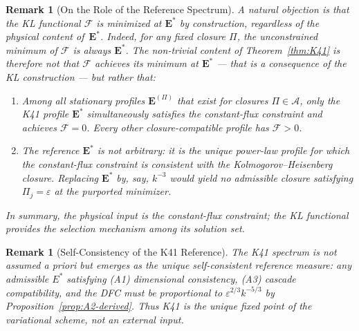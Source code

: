 \documentclass[12pt,a4paper]{article}
\theoremstyle{breakdef}
\theoremstyle{breakplain}
\theoremstyle{breakdef}
\newtheorem{remark}[definition]{Remark}
\begin{document}
\begin{remark}[On the Role of the Reference Spectrum]\label{rem:circularity}
A natural objection is that the KL functional $\mathcal{F}$ is
\emph{minimized at} $\mathbf{E}^*$ \emph{by construction}, regardless
of the physical content of~$\mathbf{E}^*$.  Indeed, for any fixed
closure $\Pi$, the unconstrained minimum of $\mathcal{F}$ is always
$\mathbf{E}^*$.  The non-trivial content of Theorem~\ref{thm:K41} is
therefore not that $\mathcal{F}$ achieves its minimum at $\mathbf{E}^*$
--- that is a consequence of the KL construction --- but rather that:
\begin{enumerate}
\item Among all stationary profiles $\mathbf{E}^{(\Pi)}$ that exist for
  closures $\Pi \in \mathscr{A}$, only the K41 profile $\mathbf{E}^*$
  \emph{simultaneously satisfies} the constant-flux constraint and
  achieves $\mathcal{F} = 0$.  Every other closure-compatible profile
  has $\mathcal{F} > 0$.
\item The reference $\mathbf{E}^*$ is not arbitrary: it is the
  \emph{unique} power-law profile for which the constant-flux constraint
  is consistent with the Kolmogorov--Heisenberg closure.  Replacing
  $\mathbf{E}^*$ by, say, $k^{-3}$ would yield no admissible closure
  satisfying $\Pi_j = \varepsilon$ at the purported minimizer.
\end{enumerate}
In summary, the physical input is the constant-flux constraint; the KL
functional provides the selection mechanism among its solution set.
\end{remark}

\begin{remark}[Self-Consistency of the K41 Reference]
\label{rem:k41-selfconsistency}
The K41 spectrum is not assumed \emph{a priori} but emerges as the unique self-consistent reference measure: any admissible $E^*$ satisfying (A1) dimensional consistency, (A3) cascade compatibility, and the DFC must be proportional to $\varepsilon^{2/3} k^{-5/3}$ by Proposition~\ref{prop:A2-derived}. Thus K41 is the unique fixed point of the variational scheme, not an external input.
\end{remark}
\end{document}

